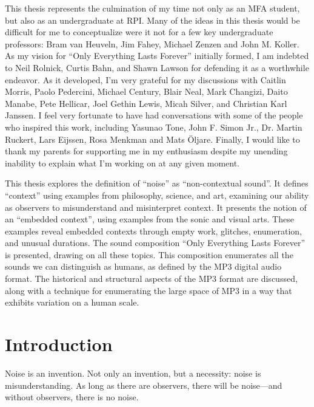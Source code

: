 \documentclass{thesis}
\author{Kyle McDonald}
\begin{document}
 
\titlepage
\tableofcontents
\listoffigures %


This thesis represents the culmination of my time not only as an MFA student, but also as an undergraduate at RPI. Many of the ideas in this thesis would be difficult for me to conceptualize were it not for a few key undergraduate professors: Bram van Heuveln, Jim Fahey, Michael Zenzen and John M. Koller. As my vision for ``Only Everything Lasts Forever'' initially formed, I am indebted to Neil Rolnick, Curtis Bahn, and Shawn Lawson for defending it as a worthwhile endeavor. As it developed, I'm very grateful for my discussions with Caitlin Morris, Paolo Pedercini, Michael Century, Blair Neal, Mark Changizi, Daito Manabe, Pete Hellicar, Joel Gethin Lewis, Micah Silver, and Christian Karl Janssen. I feel very fortunate to have had conversations with some of the people who inspired this work, including Yasunao Tone, John F. Simon Jr., Dr. Martin Ruckert, Lars Eijssen, Rosa Menkman and Mats \"Oljare. Finally, I would like to thank my parents for supporting me in my enthusiasm despite my unending inability to explain what I'm working on at any given moment.


This thesis explores the definition of ``noise'' as ``non-contextual sound''. It defines ``context'' using examples from philosophy, science, and art, examining our ability as observers to misunderstand and misinterpret context. It presents the notion of an ``embedded context'', using examples from the sonic and visual arts. These examples reveal embedded contexts through empty work, glitches, enumeration, and unusual durations. The sound composition ``Only Everything Lasts Forever'' is presented, drawing on all these topics. This composition enumerates all the sounds we can distinguish as humans, as defined by the MP3 digital audio format. The historical and structural aspects of the MP3 format are discussed, along with a technique for enumerating the large space of MP3 in a way that exhibits variation on a human scale.

\chapter{Introduction}

Noise is an invention. Not only an invention, but a necessity: noise is misunderstanding. As long as there are observers, there will be noise---and without observers, there is no noise.
\end{document}

